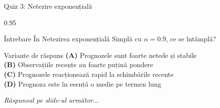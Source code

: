 \documentclass[9pt, aspectratio=169, t]{beamer}
\begin{document}
\begin{frame}{Quiz 3: Netezire exponențială}
    \begin{cminipage}{0.95\textwidth}
    \begin{alertblock}{Întrebare}
        În Netezirea exponențială Simplă cu $\alpha = 0.9$, ce se întâmplă?
    \end{alertblock}

    \vspace{0.4cm}

    \begin{block}{Variante de răspuns}
        \textcolor{MainBlue}{\textbf{(A)}} Prognozele sunt foarte netede și stabile\\[3pt]
        \textcolor{MainBlue}{\textbf{(B)}} Observațiile recente au foarte puțină pondere\\[3pt]
        \textcolor{MainBlue}{\textbf{(C)}} Prognozele reacționează rapid la schimbările recente\\[3pt]
        \textcolor{MainBlue}{\textbf{(D)}} Prognoza este în esență o medie pe termen lung
    \end{block}

    \vspace{0.5cm}

    \begin{center}
        \textit{Răspunsul pe slide-ul următor...}
    \end{center}
    \end{cminipage}
\end{frame}
\end{document}
